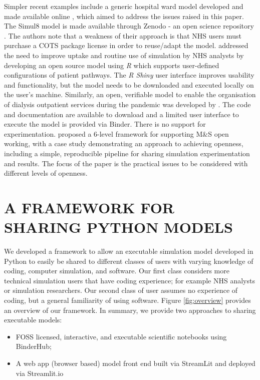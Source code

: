 \documentclass{swpaperproc}
\theoremstyle{sw}
\begin{document}
Simpler recent examples include a generic hospital ward model developed and made available online \cite{penn_towards_2020}, which aimed to address the issues raised in this paper. The Simul8 model is made available through Zenodo  - an open science repository  \cite{penn_marion_louise_2018_1468288}. The authors note that a weakness of their approach is that NHS users must purchase a COTS package license in order to reuse/adapt the model.  addressed the need to improve uptake and routine use of simulation by NHS analysts by developing an open source model using \textit{R} which supports user-defined configurations of patient pathways. The \textit{R Shiny} user interface improves usability and functionality, but the model needs to be downloaded and executed locally on the user's machine.  Similarly, an open, verifiable model to enable the organisation of dialysis outpatient services during the pandemic was developed by . The code and documentation are available to download and a limited user interface to execute the model is provided via Binder. There is no support for experimentation.  proposed a 6-level framework for supporting M\&S open working, with a case study demonstrating an approach to achieving openness, including a simple, reproducible pipeline for sharing simulation experimentation and results. The focus of the paper is the practical issues to be considered with different levels of openness. 

\section{A FRAMEWORK FOR SHARING PYTHON MODELS}
\label{sec:methods}

We developed a framework to allow an executable simulation model developed in Python to easily be shared to different classes of users with varying knowledge of coding, computer simulation, and software. Our first class considers more technical simulation users that have coding experience; for example NHS analysts or simulation researchers. Our second class of user assumes no experience of coding, but a general familiarity of using software. Figure \ref{fig:overview} provides an overview of our framework. In summary, we provide two approaches to sharing executable models:

\begin{itemize}
    \item FOSS licensed, interactive, and executable scientific notebooks using BinderHub;
    \item A web app (browser based) model front end built via StreamLit and deployed via Streamlit.io
\end{itemize}
\end{document}
